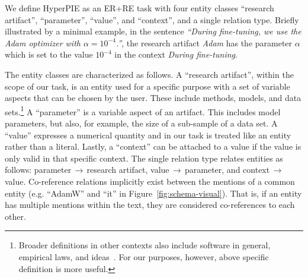 We define HyperPIE as an ER+RE task with four entity classes ``research artifact'', ``parameter'', ``value'', and ``context'', and a single relation type. Briefly illustrated by a minimal example, in the sentence \textit{``During fine-tuning, we use the Adam optimizer with $\mathit{\alpha=10^{-4}}$.''}, the research artifact \textit{Adam} has the parameter $\mathit{\alpha}$ which is set to the value $\mathit{10^{-4}}$ in the context \textit{During fine-tuning}.

The entity classes are characterized as follows. A ``research artifact'', within the scope of our task, is an entity used for a specific purpose with a set of variable aspects that can be chosen by the user. These include methods, models, and data sets.\footnote{Broader definitions in other contexts also include software in general, empirical laws, and ideas~\cite{Lin2022}. For our purposes, however, above specific definition is more useful.} A ``parameter'' is a variable aspect of an artifact. This includes model parameters, but also, for example, the size of a sub-sample of a data set. A ``value'' expresses a numerical quantity and in our task is treated like an entity rather than a literal. Lastly, a ``context'' can be attached to a value if the value is only valid in that specific context. The single relation type relates entities as follows: parameter\,$\rightarrow$\,research artifact, value\,$\rightarrow$\,parameter, and context\,$\rightarrow$\,value.
Co-reference relations %
implicitly exist between the mentions of a common entity (e.g. ``AdamW'' and ``it'' in Figure~\ref{fig:schema-visual}). That is, if an entity has multiple mentions within the text, they are considered co-references to each other.





